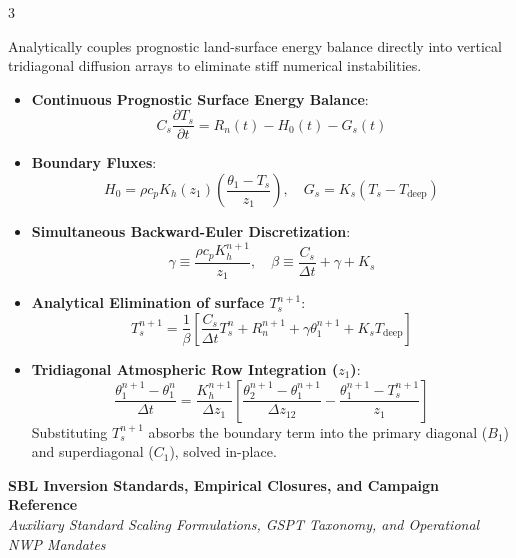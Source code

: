 \documentclass[9pt,landscape,letterpaper]{article}
\begin{document}
\begin{multicols}{3}
\begin{tcolorbox}[cheatsheetbox, title=3. SCM Implicit Coupling \& SEB]
Analytically couples prognostic land-surface energy balance directly into vertical tridiagonal diffusion arrays to eliminate stiff numerical instabilities.
\begin{itemize}
    \item \textbf{Continuous Prognostic Surface Energy Balance}:
    $$C_s \frac{\partial T_s}{\partial t} = R_n(t) - H_0(t) - G_s(t)$$
    \item \textbf{Boundary Fluxes}:
    $$H_0 = \rho c_p K_h(z_1) \left(\frac{\theta_1 - T_s}{z_1}\right), \quad G_s = K_s (T_s - T_{\text{deep}})$$
    \item \textbf{Simultaneous Backward-Euler Discretization}:
    $$\gamma \equiv \frac{\rho c_p K_h^{n+1}}{z_1}, \quad \beta \equiv \frac{C_s}{\Delta t} + \gamma + K_s$$
    \item \textbf{Analytical Elimination of surface $T_s^{n+1}$}:
    $$T_s^{n+1} = \frac{1}{\beta} \left[ \frac{C_s}{\Delta t} T_s^n + R_n^{n+1} + \gamma \theta_1^{n+1} + K_s T_{\text{deep}} \right]$$
    \item \textbf{Tridiagonal Atmospheric Row Integration ($z_1$)}:
    $$\frac{\theta_1^{n+1} - \theta_1^n}{\Delta t} = \frac{K_h^{n+1}}{\Delta z_1} \left[ \frac{\theta_2^{n+1} - \theta_1^{n+1}}{\Delta z_{12}} - \frac{\theta_1^{n+1} - T_s^{n+1}}{z_1} \right]$$
    Substituting $T_s^{n+1}$ absorbs the boundary term into the primary diagonal ($B_1$) and superdiagonal ($C_1$), solved in-place.
\end{itemize}
\end{tcolorbox}

\end{multicols}

\clearpage


\begin{center}
    \textbf{\large SBL Inversion Standards, Empirical Closures, and Campaign Reference} \\
    \vskip 0.5mm
    \footnotesize \textit{Auxiliary Standard Scaling Formulations, GSPT Taxonomy, and Operational NWP Mandates}
\end{center}
\vskip 1mm
\end{document}
